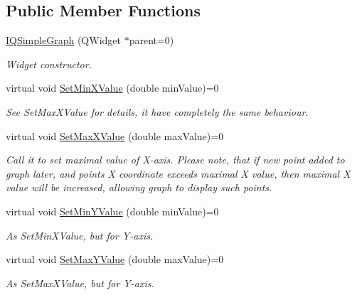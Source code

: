 \subsection*{Public Member Functions}
\begin{DoxyCompactItemize}
\item 
\hyperlink{class_fossa_1_1_q_simple_graph_1_1_interfaces_1_1_i_q_simple_graph_a7208e669127d3683d41329d110269e97}{I\+Q\+Simple\+Graph} (Q\+Widget $\ast$parent=0)
\begin{DoxyCompactList}\small\item\em Widget constructor. \end{DoxyCompactList}\item 
virtual void \hyperlink{class_fossa_1_1_q_simple_graph_1_1_interfaces_1_1_i_q_simple_graph_a4266725f87b306e572ad1ae37cfab4ef}{Set\+Min\+X\+Value} (double min\+Value)=0
\begin{DoxyCompactList}\small\item\em See Set\+Max\+X\+Value for details, it have completely the same behaviour. \end{DoxyCompactList}\item 
virtual void \hyperlink{class_fossa_1_1_q_simple_graph_1_1_interfaces_1_1_i_q_simple_graph_a04e7ec46c2be46257bef53c7bf978a2a}{Set\+Max\+X\+Value} (double max\+Value)=0
\begin{DoxyCompactList}\small\item\em Call it to set maximal value of X-\/axis. Please note, that if new point added to graph later, and point\textquotesingle{}s X coordinate exceeds maximal X value, then maximal X value will be increased, allowing graph to display such points. \end{DoxyCompactList}\item 
virtual void \hyperlink{class_fossa_1_1_q_simple_graph_1_1_interfaces_1_1_i_q_simple_graph_a3fdd1f6b538e2dfbf4a0140acd6b6e94}{Set\+Min\+Y\+Value} (double min\+Value)=0
\begin{DoxyCompactList}\small\item\em As Set\+Min\+X\+Value, but for Y-\/axis. \end{DoxyCompactList}\item 
virtual void \hyperlink{class_fossa_1_1_q_simple_graph_1_1_interfaces_1_1_i_q_simple_graph_a09e04c116810e79ca1663d2075477746}{Set\+Max\+Y\+Value} (double max\+Value)=0
\begin{DoxyCompactList}\small\item\em As Set\+Max\+X\+Value, but for Y-\/axis. \end{DoxyCompactList}\item 

\end{DoxyCompactItemize}
